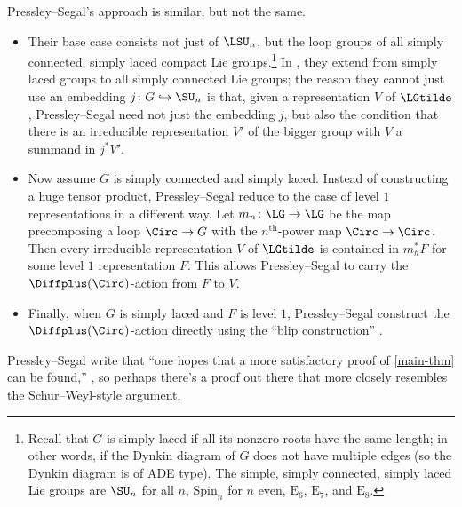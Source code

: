 Pressley--Segal's approach is similar, but not the same.
\begin{itemize}
	\item Their base case consists not just of $\LSU_n$, but the loop groups of all simply connected,
	simply laced compact Lie groups.\footnote{Recall that $G$ is simply laced if all its nonzero
	roots have the same length; in other words, if the Dynkin diagram of $G$
	does not have multiple edges (so the Dynkin diagram is of ADE type). The simple, simply connected, simply laced
	Lie groups are $\SU_n$ for all $n$, $\mathrm{Spin}_n$ for $n$ even, $\mathrm E_6$, $\mathrm E_7$, and
	$\mathrm E_8$.} In \cite[Lemma 13.4.4]{loop}, they extend from simply laced
	groups to all simply connected Lie groups; the reason they cannot just use an embedding $j\colon
	G\hookrightarrow \SU_n$ is that, given a representation $V$ of $\LGtilde$, Pressley--Segal need not
	just the embedding $j$, but also the condition that there is an irreducible representation $V'$ of the bigger
	group with $V$ a summand in $j^*V'$.
	\item Now assume $G$ is simply connected and simply laced. Instead of constructing a huge tensor product,
	Pressley--Segal reduce to the case of level $1$ representations in a different way. Let $m_n\colon\LG\to\LG$ be
	the map precomposing a loop $\Circ\to G$ with the $n^{\mathrm{th}}$-power map $\Circ\to\Circ$.
	Then \cite[Proposition 9.3.9]{loop} every irreducible representation $V$ of $\LGtilde$ is contained in $m_h^*F$
	for some level $1$ representation $F$. This allows Pressley--Segal to carry the $\Diffplus(\Circ)$-action from
	$F$ to $V$.
	\item Finally, when $G$ is simply laced and $F$ is level $1$, Pressley--Segal construct the
	$\Diffplus(\Circ)$-action directly using the ``blip construction'' \cite[\S 13.2, \S 13.3]{loop}.
\end{itemize}
\begin{remark}
Pressley--Segal write that ``one hopes that a more satisfactory proof of \cref{main-thm} can be
found,'' \cite[p.\ 271]{loop}, so perhaps there's a proof out there that more closely resembles the
Schur--Weyl-style argument.
\end{remark}



